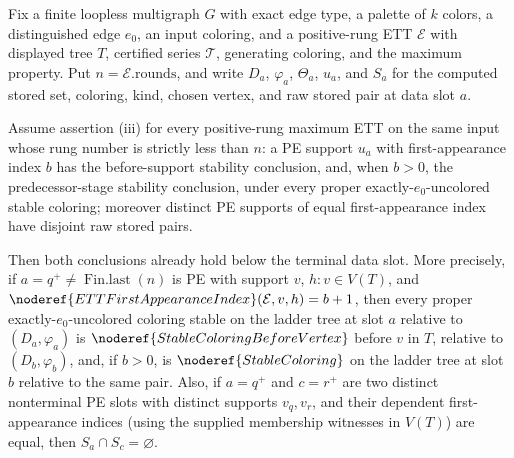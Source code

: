 \begin{helper}
Fix a finite loopless multigraph \(G\) with exact edge type, a palette of
\(k\) colors, a distinguished edge \(e_0\), an input coloring, and a
positive-rung ETT \(\mathcal E\) with displayed tree \(T\), certified series
\(\mathcal T\), generating coloring, and the maximum property.  Put
\(n=\mathcal E.\mathrm{rounds}\), and write \(D_a\), \(\varphi_a\),
\(\Theta_a\), \(u_a\), and \(S_a\) for the computed stored set, coloring,
kind, chosen vertex, and raw stored pair at data slot \(a\).

Assume assertion (iii) for every positive-rung maximum ETT on the same input
whose rung number is strictly less than \(n\): a PE support \(u_a\) with
first-appearance index \(b\) has the before-support stability conclusion,
and, when \(b>0\), the predecessor-stage stability conclusion, under every
proper exactly-\(e_0\)-uncolored stable coloring; moreover distinct PE
supports of equal first-appearance index have disjoint raw stored pairs.

Then both conclusions already hold below the terminal data slot.  More
precisely, if \(a=q^+\ne\operatorname{Fin.last}(n)\) is PE with support
\(v\), \(h:v\in V(T)\), and
\(\noderef{ETTFirstAppearanceIndex}(\mathcal E,v,h)=b+1\), then every proper
exactly-\(e_0\)-uncolored coloring stable on the ladder tree at slot \(a\)
relative to \((D_a,\varphi_a)\) is
\(\noderef{StableColoringBeforeVertex}\) before \(v\) in \(T\), relative to
\((D_b,\varphi_b)\), and, if \(b>0\), is
\(\noderef{StableColoring}\) on the ladder tree at slot \(b\) relative to
the same pair.  Also, if \(a=q^+\) and \(c=r^+\) are two distinct
nonterminal PE slots with distinct supports \(v_q,v_r\), and their dependent
first-appearance indices (using the supplied membership witnesses in
\(V(T)\)) are equal, then \(S_a\cap S_c=\varnothing\).
\end{helper}
